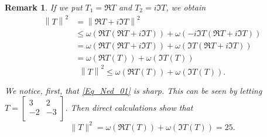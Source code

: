 \documentclass[12pt,twoside,reqno]{amsart}
\newtheorem{remark}{Remark}[section]
\numberwithin{equation}{section}
\begin{document}
\begin{remark}
If we put ${{T}_{1}}=\Re T$ and ${{T}_{2}}=i\Im T$, we obtain
	\[\begin{aligned}
   {{\left\| T \right\|}^{2}}&={{\left\| \Re T+i\Im T \right\|}^{2}} \\ 
 & \le \omega \left( \Re T\left( \Re T+i\Im T \right) \right)+\omega \left( -i\Im T\left( \Re T+i\Im T \right) \right) \\ 
 & =\omega \left( \Re T\left( \Re T+i\Im T \right) \right)+\omega \left( \Im T\left( \Re T+i\Im T \right) \right) \\ 
 & =\omega \left( \Re T\left( T \right) \right)+\omega \left( \Im T\left( T \right) \right)  
\end{aligned}\]
\begin{equation}\label{Eq_Ned_01}
{{\left\| T \right\|}^{2}}\le \omega \left( \Re T\left( T \right) \right)+\omega \left( \Im T\left( T \right) \right).
\end{equation}
	
	
	We notice, first, that \eqref{Eq_Ned_01} is sharp. This can be seen by letting 
	$T=\left[
\begin{array}{cc}
 3 & 2 \\
 -2 & -3 \\
\end{array}
\right].$ Then direct calculations show that
\[\|T\|^2=\omega \left( \Re T\left( T \right) \right)+\omega \left( \Im T\left( T \right) \right)=25.\]


\end{remark}
\end{document}
